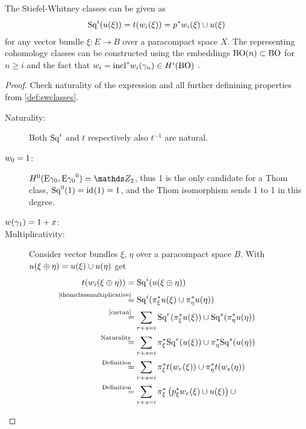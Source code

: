 \begin{Thm}\label{altdefswclasses}
  The Stiefel-Whitney classes can be given as
  \begin{gather*}
    \mathrm{Sq}^{i}(u(\xi)) = t(w_i(\xi)) = {p}^* w_i(\xi) \cup u(\xi)
  \end{gather*}
  for any vector bundle $\xi\colon E\to B$ over a paracompact space
  $X$.
  The representing cohomology classes can be constructed using the
  embeddings $\mathrm{BO}(n)\subset\mathrm{BO}$ for $n\geq i$ and the fact that
  $w_i={\mathrm{incl}}^*w_i(\gamma_n)\in H^i(\mathrm{BO})$ %
  .
  \begin{proof}
    Check naturality of the expression and all further
    definining properties from \ref{def:swclasses}.
    \begin{description}
    \item[Naturality:] Both $\mathrm{Sq}^{i}$ and $t$ respectively also $t^{-1}$
      are natural.
    \item[$w_0=1$:]
      $H^0(\thomspacepair{\E{\gamma_0}}) = \Zmod2$, thus 1 is the only
      candidate for a Thom class, $\mathrm{Sq}^{0}(1) = \mathrm{id}_{}(1) = 1$, and the Thom
      isomorphism sends 1 to 1 in this degree.
    \item[$w(\gamma_1)=1+x$:] %
    \item[Multiplicativity:] %
      Consider vector bundles $\xi$, $\eta$ over a paracompact space
      $B$. With $u(\xi\oplus\eta)=u(\xi)\cup u(\eta)$ get
      \begin{align*} %
        \thomiso(\w_i(\xi\oplus\eta))
        &= \Sq i(\u(\xi\oplus\eta)) \\
        &\overset{\mathllap{\text{\autoref{thomclassmultiplicative}}}}=
          \Sq i(\pb\pi_\xi\u(\xi) \cup \pb\pi_\eta\u(\eta))\\
        &\overset{\mathllap{\text{\ref{cartan}}}}=
          \sum_{r+s=i}
          \Sq r(\pb\pi_\xi\u(\xi)) \cup \Sq s(\pb \pi_\eta\u(\eta)) \\
        &\overset{\mathllap{\text{Naturality}}}=
          \sum_{r+s=i}
          \pb\pi_\xi\Sq r(\u(\xi)) \cup \pb \pi_\eta\Sq s(\u(\eta)) \\
        &\overset{\mathllap{\text{Definition}}}=
          \sum_{r+s=i}
          \pb\pi_\xi\thomiso(\w_r(\xi))
          \cup \pb\pi_\eta\thomiso(\w_s(\eta)) \\
        &\overset{\mathllap{\text{Definition}}}=
          \sum_{r+s=i}
          \pb\pi_\xi \left(\pb p_\xi  \w_r(\xi)  \cup \u(\xi) \right)
          \cup

\end{align*}
\end{description}
\end{proof}
\end{Thm}
